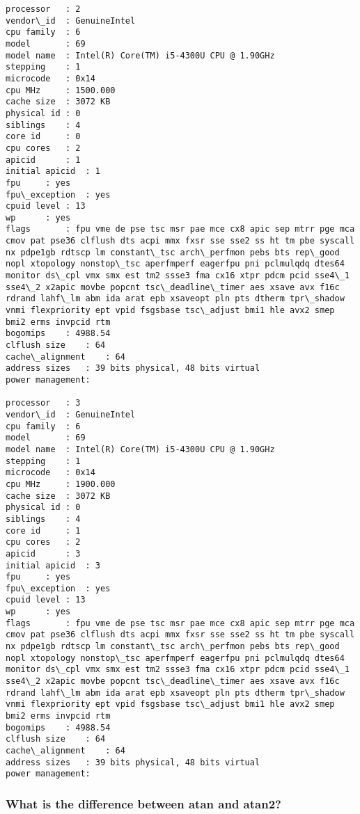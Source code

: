 \begin{addmargin}[\cellleftmargin]{0em}
{\begin{Verbatim}[commandchars=\\\{\}]
processor	: 2
vendor\_id	: GenuineIntel
cpu family	: 6
model		: 69
model name	: Intel(R) Core(TM) i5-4300U CPU @ 1.90GHz
stepping	: 1
microcode	: 0x14
cpu MHz		: 1500.000
cache size	: 3072 KB
physical id	: 0
siblings	: 4
core id		: 0
cpu cores	: 2
apicid		: 1
initial apicid	: 1
fpu		: yes
fpu\_exception	: yes
cpuid level	: 13
wp		: yes
flags		: fpu vme de pse tsc msr pae mce cx8 apic sep mtrr pge mca cmov pat pse36 clflush dts acpi mmx fxsr sse sse2 ss ht tm pbe syscall nx pdpe1gb rdtscp lm constant\_tsc arch\_perfmon pebs bts rep\_good nopl xtopology nonstop\_tsc aperfmperf eagerfpu pni pclmulqdq dtes64 monitor ds\_cpl vmx smx est tm2 ssse3 fma cx16 xtpr pdcm pcid sse4\_1 sse4\_2 x2apic movbe popcnt tsc\_deadline\_timer aes xsave avx f16c rdrand lahf\_lm abm ida arat epb xsaveopt pln pts dtherm tpr\_shadow vnmi flexpriority ept vpid fsgsbase tsc\_adjust bmi1 hle avx2 smep bmi2 erms invpcid rtm
bogomips	: 4988.54
clflush size	: 64
cache\_alignment	: 64
address sizes	: 39 bits physical, 48 bits virtual
power management:

processor	: 3
vendor\_id	: GenuineIntel
cpu family	: 6
model		: 69
model name	: Intel(R) Core(TM) i5-4300U CPU @ 1.90GHz
stepping	: 1
microcode	: 0x14
cpu MHz		: 1900.000
cache size	: 3072 KB
physical id	: 0
siblings	: 4
core id		: 1
cpu cores	: 2
apicid		: 3
initial apicid	: 3
fpu		: yes
fpu\_exception	: yes
cpuid level	: 13
wp		: yes
flags		: fpu vme de pse tsc msr pae mce cx8 apic sep mtrr pge mca cmov pat pse36 clflush dts acpi mmx fxsr sse sse2 ss ht tm pbe syscall nx pdpe1gb rdtscp lm constant\_tsc arch\_perfmon pebs bts rep\_good nopl xtopology nonstop\_tsc aperfmperf eagerfpu pni pclmulqdq dtes64 monitor ds\_cpl vmx smx est tm2 ssse3 fma cx16 xtpr pdcm pcid sse4\_1 sse4\_2 x2apic movbe popcnt tsc\_deadline\_timer aes xsave avx f16c rdrand lahf\_lm abm ida arat epb xsaveopt pln pts dtherm tpr\_shadow vnmi flexpriority ept vpid fsgsbase tsc\_adjust bmi1 hle avx2 smep bmi2 erms invpcid rtm
bogomips	: 4988.54
clflush size	: 64
cache\_alignment	: 64
address sizes	: 39 bits physical, 48 bits virtual
power management:
    \end{Verbatim}
}%
    \end{addmargin}%

    \subsubsection{What is the difference between atan and atan2?}



